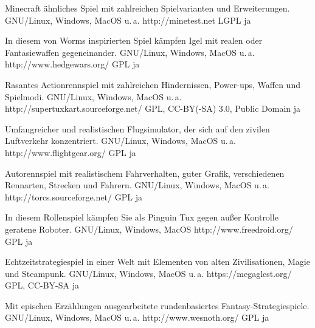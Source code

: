 



{Minecraft ähnliches Spiel mit zahlreichen Spielvarianten und Erweiterungen.}
{GNU/Linux, Windows, MacOS u.\,a.}
{http://minetest.net}
{LGPL}
{ja}

{In diesem von Worms inspirierten Spiel kämpfen Igel mit realen oder Fantasiewaffen gegeneinander.}
{GNU/Linux, Windows, MacOS u.\,a.}
{http://www.hedgewars.org/}
{GPL}
{ja}

{Rasantes Actionrennspiel mit zahlreichen Hindernissen, Power-ups, Waffen und Spielmodi.}
{GNU/Linux, Windows, MacOS u.\,a.}
{http://supertuxkart.sourceforge.net/}
{GPL, CC-BY(-SA) 3.0, Public Domain}
{ja} 	%

{Umfangreicher und realistischen Flugsimulator, der sich auf den zivilen Luftverkehr konzentriert.}
{GNU/Linux, Windows, MacOS u.\,a.}
{http://www.flightgear.org/}
{GPL}
{ja}

{Autorennspiel mit realistischem Fahrverhalten, guter Grafik, verschiedenen Rennarten, Strecken und Fahrern.}
{GNU/Linux, Windows, MacOS u.\,a.}
{http://torcs.sourceforge.net/}
{GPL}
{ja} %


{In diesem Rollenspiel kämpfen Sie als Pinguin Tux gegen außer Kontrolle geratene Roboter.}
{GNU/Linux, Windows, MacOS}
{http://www.freedroid.org/}
{GPL}
{ja} %

{Echtzeitstrategiespiel in einer Welt mit Elementen von alten Zivilisationen, Magie und Steampunk.}
{GNU/Linux, Windows, MacOS u.\,a.}
{https://megaglest.org/}
{GPL, CC-BY-SA}
{ja}

{Mit epischen Erzählungen ausgearbeitete rundenbasiertes Fantasy-Strategiespiele.}
{GNU/Linux, Windows, MacOS u.\,a.}
{http://www.wesnoth.org/}
{GPL}
{ja}

\backpage



